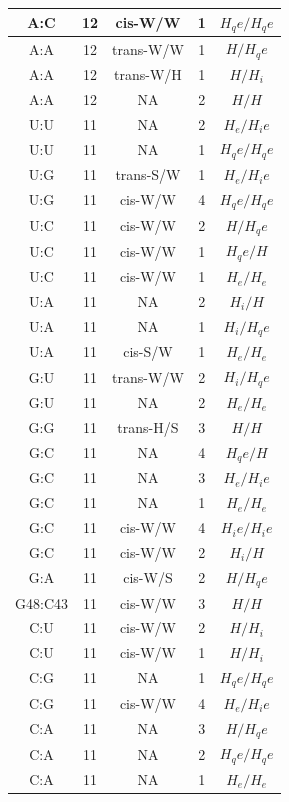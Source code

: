 \begin{center}
\begin{longtable}{c|c|c|c|c}
A:C & 12 & cis-W/W & 1 & $H_qe/H_qe$ \\  \hline
A:A & 12 & trans-W/W & 1 & $H/H_qe$ \\  \hline
A:A & 12 & trans-W/H & 1 & $H/H_i$ \\  \hline
A:A & 12 & NA & 2 & $H/H$ \\  \hline
U:U & 11 & NA & 2 & $H_e/H_ie$ \\  \hline
U:U & 11 & NA & 1 & $H_qe/H_qe$ \\  \hline
U:G & 11 & trans-S/W & 1 & $H_e/H_ie$ \\  \hline
U:G & 11 & cis-W/W & 4 & $H_qe/H_qe$ \\  \hline
U:C & 11 & cis-W/W & 2 & $H/H_qe$ \\  \hline
U:C & 11 & cis-W/W & 1 & $H_qe/H$ \\  \hline
U:C & 11 & cis-W/W & 1 & $H_e/H_e$ \\  \hline
U:A & 11 & NA & 2 & $H_i/H$ \\  \hline
U:A & 11 & NA & 1 & $H_i/H_qe$ \\  \hline
U:A & 11 & cis-S/W & 1 & $H_e/H_e$ \\  \hline
G:U & 11 & trans-W/W & 2 & $H_i/H_qe$ \\  \hline
G:U & 11 & NA & 2 & $H_e/H_e$ \\  \hline
G:G & 11 & trans-H/S & 3 & $H/H$ \\  \hline
G:C & 11 & NA & 4 & $H_qe/H$ \\  \hline
G:C & 11 & NA & 3 & $H_e/H_ie$ \\  \hline
G:C & 11 & NA & 1 & $H_e/H_e$ \\  \hline
G:C & 11 & cis-W/W & 4 & $H_ie/H_ie$ \\  \hline
G:C & 11 & cis-W/W & 2 & $H_i/H$ \\  \hline
G:A & 11 & cis-W/S & 2 & $H/H_qe$ \\  \hline
G48:C43 & 11 & cis-W/W & 3 & $H/H$ \\  \hline
C:U & 11 & cis-W/W & 2 & $H/H_i$ \\  \hline
C:U & 11 & cis-W/W & 1 & $H/H_i$ \\  \hline
C:G & 11 & NA & 1 & $H_qe/H_qe$ \\  \hline
C:G & 11 & cis-W/W & 4 & $H_e/H_ie$ \\  \hline
C:A & 11 & NA & 3 & $H/H_qe$ \\  \hline
C:A & 11 & NA & 2 & $H_qe/H_qe$ \\  \hline
C:A & 11 & NA & 1 & $H_e/H_e$ \\  \hline

\end{longtable}
\end{center}
